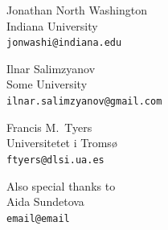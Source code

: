 \documentclass[a0paper,fontscale=0.3]{baposter}  %
\begin{document}
\begin{poster}
{			\vspace{-0.5em}
			\begin{center}
			{\begin{minipage}[t]{11.75em}
				\begin{spacing}{0.4}
					{Jonathan North Washington}\\
					{\footnotesize Indiana University\\\texttt{jonwashi@indiana.edu}}
				\end{spacing}
			\end{minipage}
			\begin{minipage}[t]{9.5em}
				\begin{spacing}{0.4}
					{Ilnar Salimzyanov}\\
					{\footnotesize Some University\\\texttt{ilnar.salimzyanov@gmail.com}}
				\end{spacing}
			\end{minipage}
			\begin{minipage}[t]{8em}
				\begin{spacing}{0.4}
					{Francis M.\ Tyers}\\
					{\footnotesize Universitetet i Tromsø\\\texttt{ftyers@dlsi.ua.es}}
				\end{spacing}
			\end{minipage}}
			\begin{minipage}[t]{7em}
				\begin{spacing}{0.4}
					{\footnotesize Also special thanks to}\\
					{\small Aida Sundetova}\\
					{\footnotesize \texttt{email@email}}
				\end{spacing}
			\end{minipage}
			\end{center}


}
\end{poster}
\end{document}

